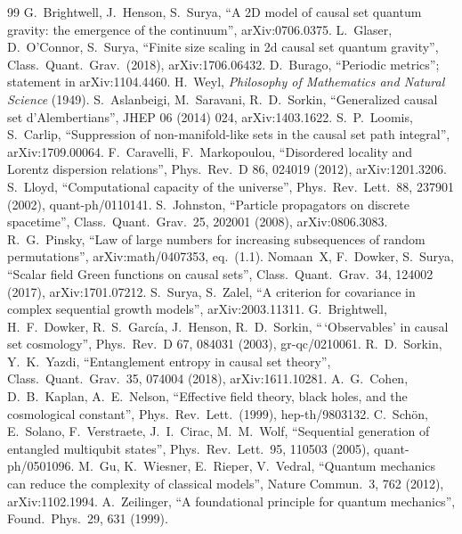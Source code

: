 \documentclass[11pt,a4paper]{article}
\begin{document}
\begin{thebibliography}{99}
 G.~Brightwell, J.~Henson, S.~Surya, ``A 2D model of causal set quantum gravity: the emergence of the continuum'', arXiv:0706.0375.
 L.~Glaser, D.~O'Connor, S.~Surya, ``Finite size scaling in 2d causal set quantum gravity'', Class.\ Quant.\ Grav.\ (2018), arXiv:1706.06432.
 D.~Burago, ``Periodic metrics''; statement in arXiv:1104.4460.
 H.~Weyl, \emph{Philosophy of Mathematics and Natural Science} (1949).
 S.~Aslanbeigi, M.~Saravani, R.~D.~Sorkin, ``Generalized causal set d'Alembertians'', JHEP 06 (2014) 024, arXiv:1403.1622.
 S.~P.~Loomis, S.~Carlip, ``Suppression of non-manifold-like sets in the causal set path integral'', arXiv:1709.00064.
 F.~Caravelli, F.~Markopoulou, ``Disordered locality and Lorentz dispersion relations'', Phys.\ Rev.\ D 86, 024019 (2012), arXiv:1201.3206.
 S.~Lloyd, ``Computational capacity of the universe'', Phys.\ Rev.\ Lett.\ 88, 237901 (2002), quant-ph/0110141.
 S.~Johnston, ``Particle propagators on discrete spacetime'', Class.\ Quant.\ Grav.\ 25, 202001 (2008), arXiv:0806.3083.
 R.~G.~Pinsky, ``Law of large numbers for increasing subsequences of random permutations'', arXiv:math/0407353, eq.~(1.1).
 Nomaan~X, F.~Dowker, S.~Surya, ``Scalar field Green functions on causal sets'', Class.\ Quant.\ Grav.\ 34, 124002 (2017), arXiv:1701.07212.
 S.~Surya, S.~Zalel, ``A criterion for covariance in complex sequential growth models'', arXiv:2003.11311.
 G.~Brightwell, H.~F.~Dowker, R.~S.~Garc\'ia, J.~Henson, R.~D.~Sorkin, ``\,`Observables' in causal set cosmology'', Phys.\ Rev.\ D 67, 084031 (2003), gr-qc/0210061.
 R.~D.~Sorkin, Y.~K.~Yazdi, ``Entanglement entropy in causal set theory'', Class.\ Quant.\ Grav.\ 35, 074004 (2018), arXiv:1611.10281.
 A.~G.~Cohen, D.~B.~Kaplan, A.~E.~Nelson, ``Effective field theory, black holes, and the cosmological constant'', Phys.\ Rev.\ Lett.\ (1999), hep-th/9803132.
 C.~Sch\"on, E.~Solano, F.~Verstraete, J.~I.~Cirac, M.~M.~Wolf, ``Sequential generation of entangled multiqubit states'', Phys.\ Rev.\ Lett.\ 95, 110503 (2005), quant-ph/0501096.
 M.~Gu, K.~Wiesner, E.~Rieper, V.~Vedral, ``Quantum mechanics can reduce the complexity of classical models'', Nature Commun.\ 3, 762 (2012), arXiv:1102.1994.
 A.~Zeilinger, ``A foundational principle for quantum mechanics'', Found.\ Phys.\ 29, 631 (1999).

\end{thebibliography}
\end{document}
